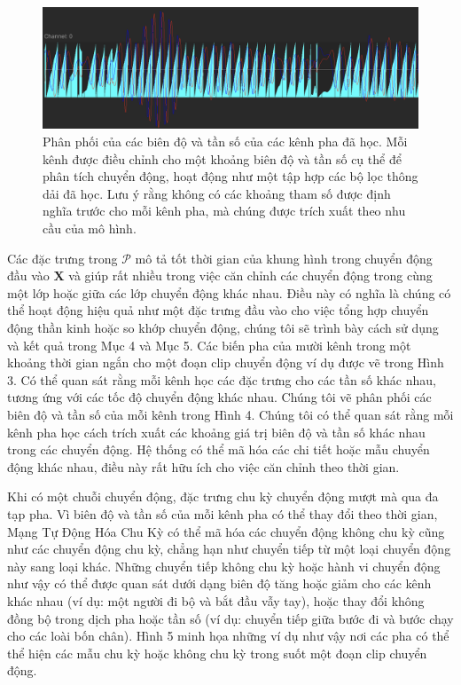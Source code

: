 \begin{figure}
	\centering
	\includegraphics[width=\linewidth]{images/PhaseChannel.png}
	\caption{Phân phối của các biên độ và tần số của các kênh pha đã học. Mỗi kênh được điều chỉnh cho một khoảng biên độ và tần số cụ thể để phân tích chuyển động, hoạt động như một tập hợp các bộ lọc thông dải đã học. Lưu ý rằng không có các khoảng tham số được định nghĩa trước cho mỗi kênh pha, mà chúng được trích xuất theo nhu cầu của mô hình.}
	\label{fig:PhaseChannel}
\end{figure}


Các đặc trưng trong $\mathcal{P}$ mô tả tốt thời gian của khung hình trong chuyển động đầu vào $\textbf{X}$ và giúp rất nhiều trong việc căn chỉnh các chuyển động trong cùng một lớp hoặc giữa các lớp chuyển động khác nhau. Điều này có nghĩa là chúng có thể hoạt động hiệu quả như một đặc trưng đầu vào cho việc tổng hợp chuyển động thần kinh hoặc so khớp chuyển động, chúng tôi sẽ trình bày cách sử dụng và kết quả trong Mục 4 và Mục 5. Các biến pha của mười kênh trong một khoảng thời gian ngắn cho một đoạn clip chuyển động ví dụ được vẽ trong Hình 3. Có thể quan sát rằng mỗi kênh học các đặc trưng cho các tần số khác nhau, tương ứng với các tốc độ chuyển động khác nhau. Chúng tôi vẽ phân phối các biên độ và tần số của mỗi kênh trong Hình 4. Chúng tôi có thể quan sát rằng mỗi kênh pha học cách trích xuất các khoảng giá trị biên độ và tần số khác nhau trong các chuyển động. Hệ thống có thể mã hóa các chi tiết hoặc mẫu chuyển động khác nhau, điều này rất hữu ích cho việc căn chỉnh theo thời gian.

Khi có một chuỗi chuyển động, đặc trưng chu kỳ chuyển động mượt mà qua đa tạp pha. Vì biên độ và tần số của mỗi kênh pha có thể thay đổi theo thời gian, Mạng Tự Động Hóa Chu Kỳ có thể mã hóa các chuyển động không chu kỳ cũng như các chuyển động chu kỳ, chẳng hạn như chuyển tiếp từ một loại chuyển động này sang loại khác. Những chuyển tiếp không chu kỳ hoặc hành vi chuyển động như vậy có thể được quan sát dưới dạng biên độ tăng hoặc giảm cho các kênh khác nhau (ví dụ: một người đi bộ và bắt đầu vẫy tay), hoặc thay đổi không đồng bộ trong dịch pha hoặc tần số (ví dụ: chuyển tiếp giữa bước đi và bước chạy cho các loài bốn chân). Hình 5 minh họa những ví dụ như vậy nơi các pha có thể thể hiện các mẫu chu kỳ hoặc không chu kỳ trong suốt một đoạn clip chuyển động.



